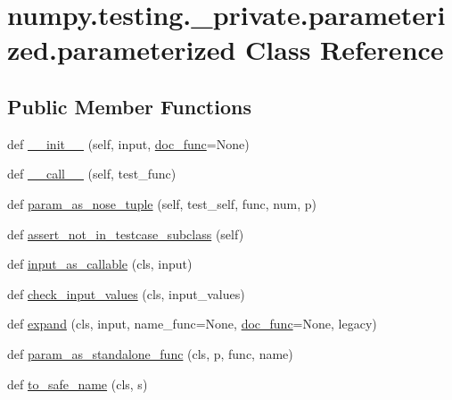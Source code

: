 \hypertarget{classnumpy_1_1testing_1_1__private_1_1parameterized_1_1parameterized}{}\section{numpy.\+testing.\+\_\+private.\+parameterized.\+parameterized Class Reference}
\label{classnumpy_1_1testing_1_1__private_1_1parameterized_1_1parameterized}
\subsection*{Public Member Functions}
\begin{DoxyCompactItemize}
\item 
def \hyperlink{classnumpy_1_1testing_1_1__private_1_1parameterized_1_1parameterized_a6cdd9fb0bb2817f59b25dea9f841d8f4}{\+\_\+\+\_\+init\+\_\+\+\_\+} (self, input, \hyperlink{classnumpy_1_1testing_1_1__private_1_1parameterized_1_1parameterized_a1107701ccce67924c8f473db0aa437e2}{doc\+\_\+func}=None)
\item 
def \hyperlink{classnumpy_1_1testing_1_1__private_1_1parameterized_1_1parameterized_ad58fb1474f5a2d5d6ec0682f2e1beac1}{\+\_\+\+\_\+call\+\_\+\+\_\+} (self, test\+\_\+func)
\item 
def \hyperlink{classnumpy_1_1testing_1_1__private_1_1parameterized_1_1parameterized_afbd31db21c4afb66f3f30485cacb4ac8}{param\+\_\+as\+\_\+nose\+\_\+tuple} (self, test\+\_\+self, func, num, p)
\item 
def \hyperlink{classnumpy_1_1testing_1_1__private_1_1parameterized_1_1parameterized_a83ea62e3485af4f4b91426c5cdaa85d9}{assert\+\_\+not\+\_\+in\+\_\+testcase\+\_\+subclass} (self)
\item 
def \hyperlink{classnumpy_1_1testing_1_1__private_1_1parameterized_1_1parameterized_afab367d8a333ac80862e229b8f2551f3}{input\+\_\+as\+\_\+callable} (cls, input)
\item 
def \hyperlink{classnumpy_1_1testing_1_1__private_1_1parameterized_1_1parameterized_a5383d6a1672201b4ebefbaed0915f3c2}{check\+\_\+input\+\_\+values} (cls, input\+\_\+values)
\item 
def \hyperlink{classnumpy_1_1testing_1_1__private_1_1parameterized_1_1parameterized_a27ee6a4054e5c7a868190ad28a4d4c50}{expand} (cls, input, name\+\_\+func=None, \hyperlink{classnumpy_1_1testing_1_1__private_1_1parameterized_1_1parameterized_a1107701ccce67924c8f473db0aa437e2}{doc\+\_\+func}=None, legacy)
\item 
def \hyperlink{classnumpy_1_1testing_1_1__private_1_1parameterized_1_1parameterized_a05d68a0910ac5bc5b1136ddad9c896a5}{param\+\_\+as\+\_\+standalone\+\_\+func} (cls, p, func, name)
\item 
def \hyperlink{classnumpy_1_1testing_1_1__private_1_1parameterized_1_1parameterized_ab4333694f712e362a86e73564daef4eb}{to\+\_\+safe\+\_\+name} (cls, s)
\end{DoxyCompactItemize}
